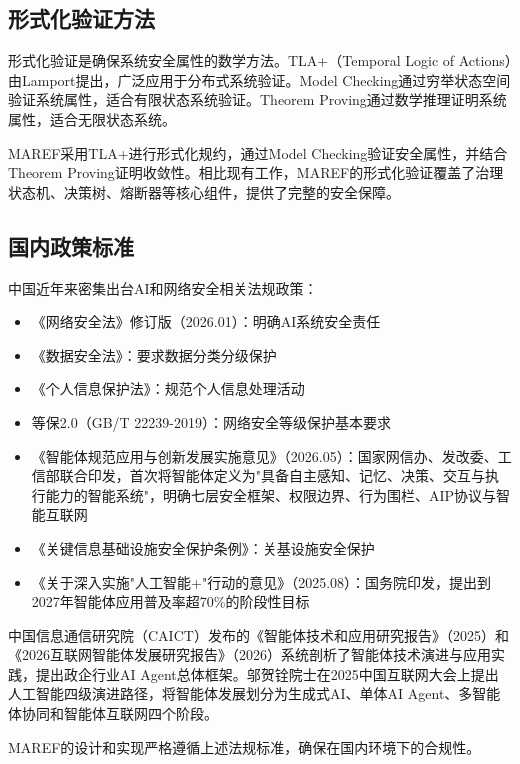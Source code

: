 \subsection{形式化验证方法}

形式化验证是确保系统安全属性的数学方法。TLA+（Temporal Logic of Actions）由Lamport提出，广泛应用于分布式系统验证。Model Checking通过穷举状态空间验证系统属性，适合有限状态系统验证。Theorem Proving通过数学推理证明系统属性，适合无限状态系统。

MAREF采用TLA+进行形式化规约，通过Model Checking验证安全属性，并结合Theorem Proving证明收敛性。相比现有工作，MAREF的形式化验证覆盖了治理状态机、决策树、熔断器等核心组件，提供了完整的安全保障。

\subsection{国内政策标准}

中国近年来密集出台AI和网络安全相关法规政策：

\begin{itemize}
    \item 《网络安全法》修订版（2026.01）：明确AI系统安全责任
    \item 《数据安全法》：要求数据分类分级保护
    \item 《个人信息保护法》：规范个人信息处理活动
    \item 等保2.0（GB/T 22239-2019）：网络安全等级保护基本要求
    \item 《智能体规范应用与创新发展实施意见》（2026.05）：国家网信办、发改委、工信部联合印发，首次将智能体定义为"具备自主感知、记忆、决策、交互与执行能力的智能系统"，明确七层安全框架、权限边界、行为围栏、AIP协议与智能互联网
    \item 《关键信息基础设施安全保护条例》：关基设施安全保护
    \item 《关于深入实施"人工智能+"行动的意见》（2025.08）：国务院印发，提出到2027年智能体应用普及率超70\%的阶段性目标
\end{itemize}

中国信息通信研究院（CAICT）发布的《智能体技术和应用研究报告》（2025）和《2026互联网智能体发展研究报告》（2026）系统剖析了智能体技术演进与应用实践，提出政企行业AI Agent总体框架\cite{caict2025,caict2026}。邬贺铨院士在2025中国互联网大会上提出人工智能四级演进路径，将智能体发展划分为生成式AI、单体AI Agent、多智能体协同和智能体互联网四个阶段\cite{whg2026}。

MAREF的设计和实现严格遵循上述法规标准，确保在国内环境下的合规性。

